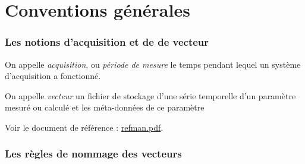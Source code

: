 \part{Conventions générales}
\label{part:conventions}

\section{Les notions d'acquisition et de de vecteur}

On appelle \textit{acquisition}, ou \textit{période de mesure} 
le temps pendant lequel un système d'acquisition a fonctionné.

On appelle \textit{vecteur} un fichier de stockage d'une série temporelle
d'un paramètre mesuré ou calculé et les méta-données de ce paramètre

Voir le document de référence : \url{refman.pdf}.


\section{Les règles de nommage des vecteurs}



